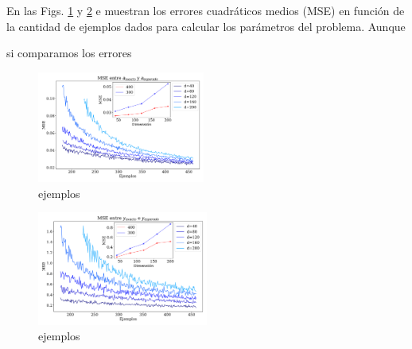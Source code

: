 En las Figs.  \ref{fig:ejer1_a_ejemplos} y \ref{fig:ejer1_y_ejemplos}  e muestran los errores cuadráticos medios  (MSE) en función de la cantidad de ejemplos dados para calcular los parámetros del problema. Aunque 

si comparamos los errores  







    \begin{figure}[H]
        \centering
        \includegraphics[width=0.49\textwidth]{plots/ejer_1_mse_a_ejemplos.pdf}
        \caption{ejemplos}
        \label{fig:ejer1_a_ejemplos}
    \end{figure}


    \begin{figure}[H]
        \centering
        \includegraphics[width=0.5\textwidth]{plots/ejer_1_mse_y_ejemplos.pdf}
        \caption{ejemplos}
        \label{fig:ejer1_y_ejemplos}
    \end{figure}

